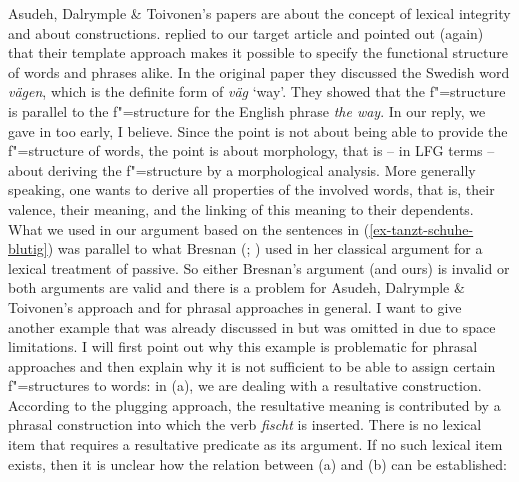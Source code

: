 Asudeh, Dalrymple \& Toivonen's papers are about the concept of lexical integrity and about
constructions. \citet{AT2014a} replied to our target article and pointed out (again) that their
template approach makes it possible to specify the functional structure of words and phrases
alike. In the original paper they discussed the Swedish word \emph{vägen}, which is the definite
form of \emph{väg} `way'. They showed that the f"=structure is parallel to the f"=structure for the
English phrase \emph{the way}. 
In our reply, \citeyearpar{MWArgStReply} we gave in too early, I believe. Since the point is
not about being able to provide the f"=structure of words, the point is about morphology, that is
-- in LFG terms -- about deriving the f"=structure by a morphological analysis. More generally
speaking, one wants to derive all properties of the involved words, that is, their valence, their
meaning, and the linking of this meaning to their dependents. What we used in our argument based on
the sentences in (\ref{ex-tanzt-schuhe-blutig}) was parallel to what Bresnan (\citeyear[]{Bresnan82a}; \citeyear[]{Bresnan2001a}) used in her classical argument for a lexical
treatment of passive. So either Bresnan's argument (and ours) is invalid or both arguments are valid and there is a problem
for Asudeh, Dalrymple \& Toivonen's approach and for phrasal approaches in general. I want to
give another example that was already discussed in  but was omitted in
 due to space limitations. I will first point out why this example is problematic for
phrasal approaches and then explain why it is not sufficient to be able to assign certain
f"=structures to words: in (a), we are dealing with a resultative construction.
According to the plugging approach, the resultative meaning is contributed by a phrasal construction into which the
verb \emph{fischt} is inserted. There is no lexical item that requires a resultative predicate as
its argument. If no such lexical item exists, then it is unclear how the relation between (a)
and (b) can be established: 

